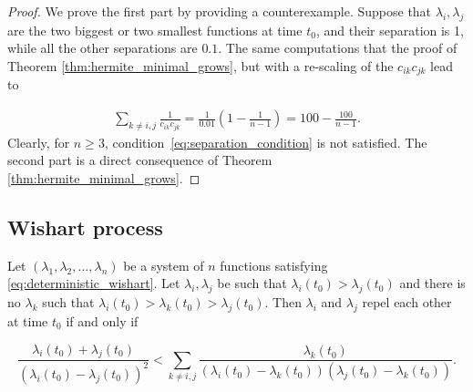 \begin{proof}
    We prove the first part by providing a counterexample. Suppose that $\lambda_i,\lambda_j$ are the two biggest or two smallest functions at time $t_0$, and their separation is 1, while all the other separations are $0.1$. The same computations that the proof of Theorem \ref{thm:hermite_minimal_grows}, but with a re-scaling of the $c_{ik}c_{jk}$ lead to

    \begin{align*}
        \sum_{k\neq i,j} \frac{1}{c_{ik}c_{jk}} = \frac{1}{0.01}\left( 1 - \frac1{n-1}\right) = 100 - \frac{100}{n-1}.
    \end{align*} Clearly, for $n\ge 3$, condition~\eqref{eq:separation_condition} is not satisfied. The second part is a direct consequence of Theorem \ref{thm:hermite_minimal_grows}.
\end{proof}

\subsection{Wishart process}

\begin{lemma} \label{lemma:separating_condition_wishart}
    Let $(\lambda_1, \lambda_2, \dots, \lambda_n)$ be a system of $n$ functions satisfying \eqref{eq:deterministic_wishart}. Let $\lambda_i, \lambda_j$ be such that $\lambda_i(t_0) > \lambda_j(t_0)$ and there is no $\lambda_k$ such that $\lambda_i(t_0) > \lambda_k(t_0) > \lambda_j(t_0)$. Then $\lambda_i$ and $\lambda_j$ repel each other at time $t_0$ if and only if 

    \begin{equation} \label{eq:separation_condition_wishart}
        \frac{\lambda_i(t_0) + \lambda_j(t_0)}{(\lambda_i(t_0) - \lambda_j(t_0))^2} < \sum_{k\neq i,j} \frac{\lambda_k(t_0)}{(\lambda_i(t_0)-\lambda_k(t_0))(\lambda_j(t_0)-\lambda_k(t_0))}.
    \end{equation}
\end{lemma}

